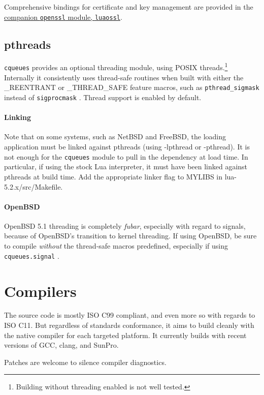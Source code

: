 \documentclass[11pt, oneside]{memoir}
\newcommand{\cqueues}[0]{\texttt{cqueues} }
\newcommand{\syscall}[1]{\texttt{#1} }
\newcommand{\module}[1]{\texttt{#1} }
\begin{document}
Comprehensive bindings for certificate and key management are provided in the \href{http://25thandClement.com/~william/projects/luaossl.html}{companion \module{openssl} module, \texttt{luaossl}}.

\subsection{pthreads}

\cqueues provides an optional threading module, using POSIX threads.\footnote{Building without threading enabled is not well tested.} Internally it consistently uses thread-safe routines when built with either the \_REENTRANT or \_THREAD\_SAFE feature macros, such as \syscall{pthread\_sigmask} instead of \syscall{sigprocmask}. Thread support is enabled by default.

\paragraph{Linking}
Note that on some systems, such as NetBSD and FreeBSD, the loading application must be linked against pthreads (using -lpthread or -pthread). It is not enough for the \cqueues module to pull in the dependency at load time. In particular, if using the stock Lua interpreter, it must have been linked against pthreads at build time. Add the appropriate linker flag to MYLIBS in lua-5.2.x/src/Makefile.

\paragraph{OpenBSD}
OpenBSD 5.1 threading is completely \emph{fubar}, especially with regard to signals, because of OpenBSD's transition to kernel threading. If using OpenBSD, be sure to compile \emph{without} the thread-safe macros predefined, especially if using \module{cqueues.signal}.

\section{Compilers}

The source code is mostly ISO C99 compliant, and even more so with regards to ISO C11. But regardless of standards conformance, it aims to build cleanly with the native compiler for each targeted platform. It currently builds with recent versions of GCC, clang, and SunPro.

Patches are welcome to silence compiler diagnostics.
\end{document}
